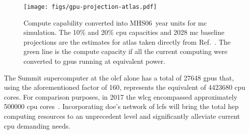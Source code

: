 \begin{figure}
  \centering%
  \texttt{[image: figs/gpu-projection-atlas.pdf]}%
  \caption{Compute capability converted into \si{MHS06.year} units for \acs{mc}
  simulation. The 10\% and 20\% \ac{cpu} capacities and 2028 \acs{mc} baseline
  projections are the estimates for \acs{atlas} taken directly from
  Ref.~\cite{the_atlas_collaboration_atlas_2020}.  The green line is the compute
  capacity if all the current computing were converted to \acp{gpu} running at
  equivalent power.}%
  \label{fig:gpu-projection}
\end{figure}

The Summit supercomputer at the \ac{olcf} alone has a total of \num{27648}
\acp{gpu} that, using the aforementioned factor of 160, represents the
equivalent of \num{4423680} \ac{cpu} cores. For comparison purposes, in 2017 the
\ac{wlcg} encompassed approximately \num{500000} \ac{cpu}
cores~\cite{valassi_using_2020}. Incorporating \ac{doe}'s network of \acp{lcf}
will bring the total \ac{hep} computing resources to an unprecedent level and
significantly alleviate current \ac{cpu} demanding needs.
